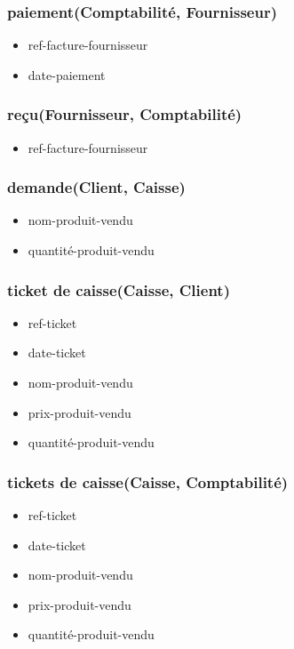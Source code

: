 \subsubsection*{paiement(Comptabilité, Fournisseur)}
\begin{itemize}
    \item ref-facture-fournisseur
    \item date-paiement
\end{itemize}

\subsubsection*{reçu(Fournisseur, Comptabilité)}
\begin{itemize}
    \item ref-facture-fournisseur
\end{itemize}

\subsubsection*{demande(Client, Caisse)}
\begin{itemize}
    \item nom-produit-vendu
    \item quantité-produit-vendu
\end{itemize}

\subsubsection*{ticket de caisse(Caisse, Client)}
\begin{itemize}
    \item ref-ticket
    \item date-ticket
    \item nom-produit-vendu
    \item prix-produit-vendu
    \item quantité-produit-vendu
\end{itemize}

\subsubsection*{tickets de caisse(Caisse, Comptabilité)}
\begin{itemize}
    \item ref-ticket
    \item date-ticket
    \item nom-produit-vendu
    \item prix-produit-vendu
    \item quantité-produit-vendu
\end{itemize}

